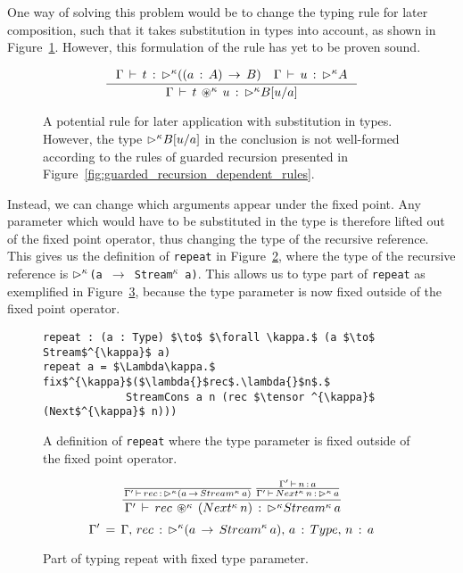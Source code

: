 One way of solving this problem would be to change the typing rule for later
composition, such that it takes substitution in types into account, as shown in
Figure~\ref{fig:tensor_with_subst}. However, this formulation of the rule has
yet to be proven sound.

\begin{figure}[h]
\[
\inference { \Gamma \, \vdash \, t\, :\, \later^{\kappa} ((a\, :\, A)\,
  \rightarrow \, B)\quad \Gamma \, \vdash \, u\, :\, \later^{\kappa} A }{
  \Gamma \, \vdash \, t\, \tensor ^{\kappa} \, u\, :\, \later^{\kappa} B[{ u
  }/{ a }] } 
\]
  \caption{A potential rule for later application with substitution in
    types. However, the type $\rhd^{\kappa} B[{ u }/{ a }]$ in the conclusion
    is not well-formed according to the rules of guarded recursion presented in Figure~\ref{fig:guarded_recursion_dependent_rules}.}
  \label{fig:tensor_with_subst}
\end{figure}

Instead, we can change which arguments appear under the fixed point. Any
parameter which would have to be substituted in the type is therefore lifted out
of the fixed point operator, 
thus changing the type of the recursive reference. This gives us
the definition of \texttt{repeat} in
Figure~\ref{fig:repeat_guarded_example_new}, where the type of the recursive
reference is \texttt{$\rhd ^{\kappa}$(a~$\rightarrow$~Stream$^{\kappa}$
  a)}. This allows us to type part of \texttt{repeat} as exemplified in
Figure~\ref{fig:repeat_typing_new}, because the type parameter is now fixed
outside of the fixed point operator.

\begin{figure}[h]
  \begin{lstlisting}[mathescape]
repeat : (a : Type) $\to$ $\forall \kappa.$ (a $\to$ Stream$^{\kappa}$ a)
repeat a = $\Lambda\kappa.$ fix$^{\kappa}$($\lambda{}$rec$.\lambda{}$n$.$ 
             StreamCons a n (rec $\tensor ^{\kappa}$ (Next$^{\kappa}$ n)))
\end{lstlisting}
  \caption{A definition of \texttt{repeat} where the type parameter is fixed
    outside of the fixed point operator.}
  \label{fig:repeat_guarded_example_new}
\end{figure}

\begin{figure}[h]
\[
\frac { \frac {  }{ \Gamma '\, \vdash \, rec\, :\, \rhd ^{\kappa}(a\, \rightarrow
    \, Stream^{\kappa}\, a) } \, \frac { \Gamma '\, \vdash \, n\, :\, a }{ \Gamma '\,
    \vdash \, Next^{\kappa}\, n\, :\, \rhd ^{\kappa}\, a }  }{ \, \Gamma '\, \vdash \, rec\,
  \circledast ^{\kappa} \, (Next^{\kappa}\, n)\, :\, \rhd ^{\kappa}Stream^{\kappa}\, a }
\]
\[
 \Gamma '\, =\, \Gamma ,\, rec\, :\, \rhd ^{\kappa}(a\, \rightarrow \, Stream^{\kappa}\,
 a),\, a\, :\, Type,\, n\, :\, a
\]

  \caption{Part of typing repeat with fixed type parameter.}
  \label{fig:repeat_typing_new}
\end{figure}

